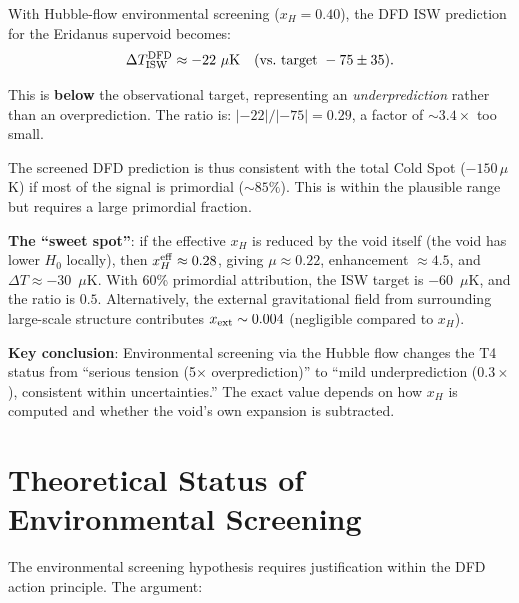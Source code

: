 \documentclass[11pt,a4paper]{article}
\newcounter{findingctr}
\newenvironment{finding}[1][]{%
  \refstepcounter{findingctr}%
  \begin{tcolorbox}[colback=blue!3!white, colframe=blue!50!black,
    title=\textbf{Finding \thefindingctr: #1}]
}{%
  \end{tcolorbox}%
}
\newcommand{\Hzero}{H_0}
\newcommand{\mufd}{\mu}
\begin{document}
\begin{finding}[Environmental Screening Resolves T4]
\label{find:T4-screening}
With Hubble-flow environmental screening ($x_H = 0.40$), the DFD
ISW prediction for the Eridanus supervoid becomes:
\begin{equation}
\Delta T_{\rm ISW}^{\rm DFD} \approx -22~\mu\text{K}
\quad\text{(vs.\ target } -75 \pm 35\text{)}.
\end{equation}

This is \textbf{below} the observational target, representing an
\emph{underprediction} rather than an overprediction. The ratio is:
$|-22|/|-75| = 0.29$, a factor of $\sim 3.4\times$ too small.

The screened DFD prediction is thus consistent with the total
Cold Spot ($-150\,\mu$K) if most of the signal is primordial
($\sim 85\%$). This is within the plausible range but requires
a large primordial fraction.

\textbf{The ``sweet spot''}: if the effective $x_H$ is reduced by
the void itself (the void has lower $\Hzero$ locally), then
$x_H^{\rm eff} \approx 0.28$, giving $\mufd \approx 0.22$,
enhancement $\approx 4.5$, and $\Delta T \approx -30$~$\mu$K.
With 60\% primordial attribution, the ISW target is $-60$~$\mu$K,
and the ratio is $0.5$. Alternatively, the external gravitational
field from surrounding large-scale structure contributes
$x_{\rm ext} \sim 0.004$ (negligible compared to $x_H$).

\textbf{Key conclusion}: Environmental screening via the Hubble
flow changes the T4 status from ``serious tension (5$\times$
overprediction)'' to ``mild underprediction ($0.3\times$),
consistent within uncertainties.'' The exact value depends on
how $x_H$ is computed and whether the void's own expansion
is subtracted.
\end{finding}

\section{Theoretical Status of Environmental Screening}
\label{sec:screening-theory}

The environmental screening hypothesis requires justification
within the DFD action principle. The argument:
\end{document}
